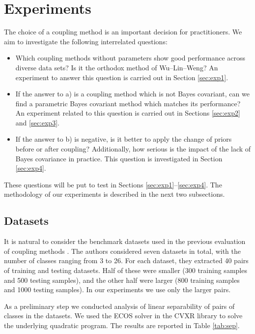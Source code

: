 \documentclass[pdflatex, sn-basic]{sn-jnl}%
\theoremstyle{thmstyleone}%
\theoremstyle{thmstyletwo}%
\theoremstyle{thmstylethree}%
\begin{document}
\section{Experiments}

The choice of a coupling method is an important decision for practitioners. 
We aim to investigate the following interrelated questions:

\begin{itemize}
	\item[(a)] Which coupling methods without parameters show good performance across diverse data sets? Is it the orthodox method of Wu--Lin--Weng? An experiment to answer this question is carried out in Section \ref{sec:exp1}. 
	\item[(b)] If the answer to a) is a coupling method which is not Bayes covariant, can we find a parametric Bayes covariant method which  matches its performance? An experiment related to this question is carried out in  Sections \ref{sec:exp2} and \ref{sec:exp3}.
	\item[(c)] If the answer to b) is negative, is it better to apply the change of priors before or after coupling? Additionally, how serious is the impact of the lack of Bayes covariance in practice. This question is investigated in Section \ref{sec:exp4}.
\end{itemize}

These questions will be put to test in Sections \ref{sec:exp1}--\ref{sec:exp4}. 
The methodology of our experiments is described in the next two subsections.

\subsection{Datasets}

It is natural to consider the benchmark datasets used in the previous evaluation 
of coupling methods \cite{wu2004probability}. The authors considered seven datasets 
in total, with the number of classes ranging from 3 to 26. For each dataset, 
they extracted 40 pairs of training and testing datasets. Half of these were 
smaller (300 training samples and 500 testing samples), and the other half 
were larger (800 training samples and 1000 testing samples). In our experiments 
we use only the larger pairs. 

As a preliminary step we conducted analysis of linear separability of pairs of classes in the datasets. 
We used the ECOS solver in the CVXR library to solve the underlying quadratic program. The results are reported in Table \ref{tab:sep}.
\end{document}
